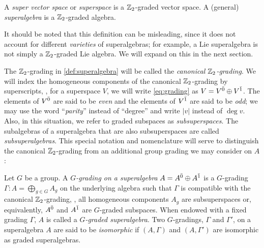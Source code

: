 

\begin{defi}\label{def:superalgebra}
    A \emph{super vector space} or \emph{superspace} is a $\mathbb{Z}_2$-graded vector space. 
    A (general) \emph{superalgebra} is a $\mathbb{Z}_2$-graded algebra. 
\end{defi}

It should be noted that this definition can be misleading, since it does not account for different \emph{varieties} of superalgebras; for example, a Lie superalgebra is not simply a $\mathbb{Z}_2$-graded Lie algebra. 
We will expand on this in the next section.

The $\mathbb{Z}_2$-grading in \cref{def:superalgebra} will be called the \emph{canonical $\mathbb{Z}_2$-grading}.
We will index the homogeneous components of the canonical $\mathbb{Z}_2$-grading by superscripts, \ie, for a superspace $V$, we will write \cref{eq:grading} as $V = V^{\bar0} \oplus V^{\bar1}$. 
The elements of $V^{\bar0}$ are said to be \emph{even} and the elements of $V^{\bar1}$ are said to be \emph{odd}; we may use the word ``\emph{parity}'' instead of ``degree'' and write $|v|$ instead of $\deg v$. 
Also, in this situation, we refer to graded subspaces as \emph{subsuperspaces}. 
The subalgebras of a superalgebra that are also subsuperspaces are called \emph{subsuperalgebras}. 
This special notation and nomenclature will serve to distinguish the canonical $\mathbb{Z}_2$-grading from an additional group grading we may consider on $A$:  

\begin{defi}\label{defi:grd-sa}
    Let $G$ be a group. 
    A \emph{$G$-grading on a superalgebra} $A = A^{\bar0} \oplus A^{\bar1}$ is a $G$-grading $\Gamma: A = \bigoplus_{g\in G} A_g$ on the underlying algebra such that $\Gamma$ is compatible with the canonical $\mathbb{Z}_2$-grading, \ie,
    all homogeneous components $A_g$ are subsuperspaces or, equivalently, $A^{\bar0}$ and $A^{\bar1}$ are $G$-graded subspaces. 
    When endowed with a fixed grading $\Gamma$, $A$ is called a \emph{$G$-graded superalgebra}. 
    Two $G$-gradings, $\Gamma$ and $\Gamma'$, on a superalgebra $A$ are said to be \emph{isomorphic} if $(A, \Gamma)$ and $(A, \Gamma')$ are isomorphic as graded superalgebras. 
\end{defi}

